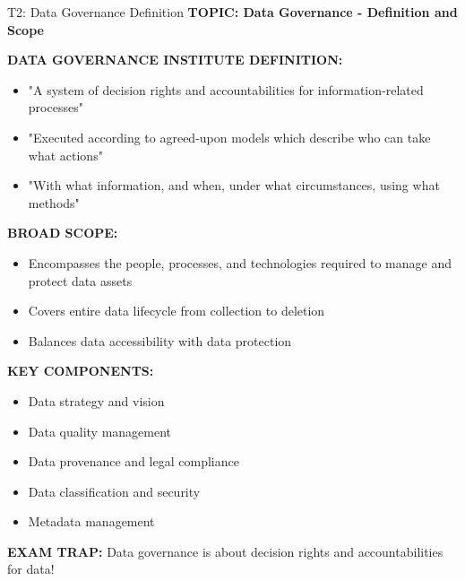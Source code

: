 \documentclass[8pt]{beamer}
\begin{document}
	\begin{frame}{T2: Data Governance Definition}
		\fontsize{6.5}{7.5}\selectfont
		\textbf{TOPIC: Data Governance - Definition and Scope}
		
		\vspace{0.1cm}
		\textbf{DATA GOVERNANCE INSTITUTE DEFINITION:}
		\begin{itemize}
			\item "A system of decision rights and accountabilities for information-related processes"
			\item "Executed according to agreed-upon models which describe who can take what actions"
			\item "With what information, and when, under what circumstances, using what methods"
		\end{itemize}
		
		\vspace{0.1cm}
		\textbf{BROAD SCOPE:}
		\begin{itemize}
			\item Encompasses the people, processes, and technologies required to manage and protect data assets
			\item Covers entire data lifecycle from collection to deletion
			\item Balances data accessibility with data protection
		\end{itemize}
		
		\vspace{0.1cm}
		\textbf{KEY COMPONENTS:}
		\begin{itemize}
			\item Data strategy and vision
			\item Data quality management
			\item Data provenance and legal compliance
			\item Data classification and security
			\item Metadata management
		\end{itemize}
		
		\textcolor{myred}{\textbf{EXAM TRAP:}} Data governance is about \textcolor{myblue}{decision rights and accountabilities} for data!
	\end{frame}
	
\end{document}
